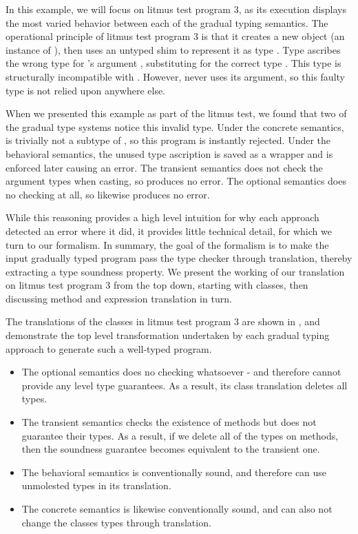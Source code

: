 \documentclass[USenglish]{tex/lipics-v2016}
\begin{document}
In this example, we will focus on litmus test program 3, as its execution
displays the most varied behavior between each of the gradual typing
semantics. The operational principle of litmus test program 3 is that it
creates a new object (an instance of \C), then uses an untyped shim to
represent it as type . Type  ascribes the wrong type for 's
argument \x, substituting  for the correct type . This type 
is structurally incompatible with . However,  never uses its
argument, so this faulty type is not relied upon anywhere else.

When we presented this example as part of the litmus test, we found that two
of the gradual type systems notice this invalid type. Under the concrete
semantics,  is trivially not a subtype of , so this program is
instantly rejected. Under the behavioral semantics, the unused type ascription
is saved as a wrapper and is enforced later causing an error. The transient
semantics does not check the argument types when casting, so produces no
error. The optional semantics does no checking at all, so likewise produces
no error.

While this reasoning provides a high level intuition for why each approach
detected an error where it did, it provides little technical detail, for which
we turn to our formalism. In summary, the goal of the formalism is to make the
input gradually typed program pass the \kafka type checker through
translation, thereby extracting a type soundness property. We present the
working of our translation on litmus test program 3 from the top down,
starting with classes, then discussing method and expression translation in
turn.

The translations of the classes in litmus test program 3 are shown in
, and demonstrate the top level transformation undertaken
by each gradual typing approach to generate such a well-typed \kafka program.

\begin{itemize}
  \item The optional semantics does no checking whatsoever - and therefore cannot
  provide any \kafka level type guarantees. As a result, its class translation 
  deletes all types.
  \item The transient semantics checks the existence of methods but does not
  guarantee their types. As a result, if we delete all of the types on methods,
  then the \kafka soundness guarantee becomes equivalent to the transient one. 
  \item The behavioral semantics is conventionally sound, and therefore can 
  use unmolested types in its \kafka translation.
  \item The concrete semantics is likewise conventionally sound, and can also
  not change the classes types through translation.
\end{itemize}
\end{document}
